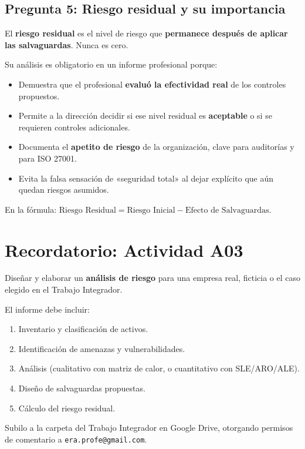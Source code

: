 \documentclass[11pt,a4paper]{article}
\begin{document}
\subsection*{Pregunta 5: Riesgo residual y su importancia}
\begin{respuesta}
El \textbf{riesgo residual} es el nivel de riesgo que \textbf{permanece después de aplicar las salvaguardas}. Nunca es cero.

Su análisis es obligatorio en un informe profesional porque:
\begin{itemize}[leftmargin=*]
  \item Demuestra que el profesional \textbf{evaluó la efectividad real} de los controles propuestos.
  \item Permite a la dirección decidir si ese nivel residual es \textbf{aceptable} o si se requieren controles adicionales.
  \item Documenta el \textbf{apetito de riesgo} de la organización, clave para auditorías y para ISO 27001.
  \item Evita la falsa sensación de «seguridad total» al dejar explícito que aún quedan riesgos asumidos.
\end{itemize}

En la fórmula: \(\text{Riesgo Residual} = \text{Riesgo Inicial} - \text{Efecto de Salvaguardas}\).
\end{respuesta}

\section{Recordatorio: Actividad A03}
\begin{clave}
Diseñar y elaborar un \textbf{análisis de riesgo} para una empresa real, ficticia o el caso elegido en el Trabajo Integrador.

El informe debe incluir:
\begin{enumerate}
  \item Inventario y clasificación de activos.
  \item Identificación de amenazas y vulnerabilidades.
  \item Análisis (cualitativo con matriz de calor, o cuantitativo con SLE/ARO/ALE).
  \item Diseño de salvaguardas propuestas.
  \item Cálculo del riesgo residual.
\end{enumerate}

Subilo a la carpeta del Trabajo Integrador en Google Drive, otorgando permisos de comentario a \texttt{era.profe@gmail.com}.
\end{clave}
\end{document}
